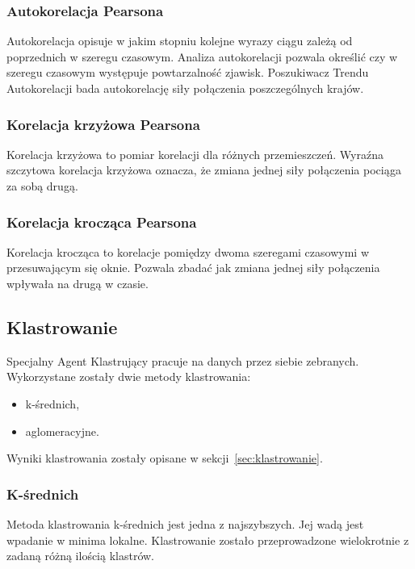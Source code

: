 \documentclass[11pt]{report}
\begin{document}
    \subsubsection{Autokorelacja Pearsona}
    Autokorelacja opisuje w jakim stopniu kolejne wyrazy ciągu zależą od poprzednich w szeregu czasowym.
    Analiza autokorelacji pozwala określić czy w szeregu czasowym występuje powtarzalność zjawisk.
    Poszukiwacz Trendu Autokorelacji bada autokorelację siły połączenia poszczególnych krajów.

    \subsubsection{Korelacja krzyżowa Pearsona}
    Korelacja krzyżowa to pomiar korelacji dla różnych przemieszczeń.
    Wyraźna szczytowa korelacja krzyżowa oznacza, że zmiana jednej siły połączenia pociąga za sobą drugą.

    \subsubsection{Korelacja krocząca Pearsona}
    Korelacja krocząca to korelacje pomiędzy dwoma szeregami czasowymi w przesuwającym się oknie.
    Pozwala zbadać jak zmiana jednej siły połączenia wpływała na drugą w czasie.

    \subsection{Klastrowanie}

    Specjalny Agent Klastrujący pracuje na danych przez siebie zebranych.
    Wykorzystane zostały dwie metody klastrowania:
    \begin{itemize}
        \item k-średnich,
        \item aglomeracyjne.
    \end{itemize}

    Wyniki klastrowania zostały opisane w sekcji~\ref{sec:klastrowanie}.

    \subsubsection{K-średnich}
    Metoda klastrowania k-średnich jest jedna z najszybszych.
    Jej wadą jest wpadanie w minima lokalne.
    Klastrowanie zostało przeprowadzone wielokrotnie z zadaną różną ilością klastrów.
\end{document}
